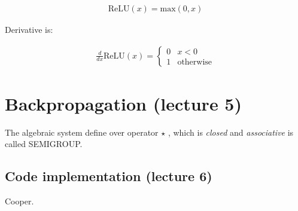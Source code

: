 \documentclass[11pt]{article}
\numberwithin{equation}{section}
\theoremstyle{definition}%
\begin{document}
\begin{align}
    \text{ReLU}(x) = \text{max}(0, x)
\end{align}

Derivative is:

\begin{align}
    \frac{d}{dx}\text{ReLU}(x) = \begin{cases}
        0 & x < 0 \\
        1 & \text{otherwise}
    \end{cases}
\end{align}

\section{Backpropagation (lecture 5)}

\begin{tcolorbox}[title=Derivation:,colframe=purple,colback=blue!5!white,arc=0pt,fonttitle=\bfseries]
    The algebraic system define over operator $\star$ , which is \emph{closed} and \emph{associative} is called SEMIGROUP.
\end{tcolorbox}


\subsection{Code implementation (lecture 6)}



\begin{thebibliography}{2}
     Cooper.

\end{thebibliography}
\end{document}

